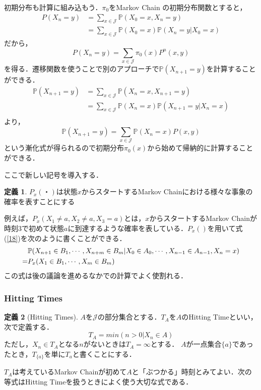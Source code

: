 \documentclass[12pt, a4paper]{jsarticle}
\theoremstyle{definition}
\newtheorem{defn}{定義}[section]
\begin{document}
初期分布も計算に組み込もう．$\pi_0$をMarkov Chain の初期分布関数とすると，
\begin{align*}
	P(X_n = y) &= \sum_{x \in \mathcal{J}}\mathbb{P} (X_0 = x, X_n = y) \\
	&= \sum_{x \in \mathcal{J}} \mathbb{P}(X_0 = x) \mathbb{P}(X_n = y | X_0 = x)
\end{align*}
だから，
\begin{equation}
	P(X_n = y) = \sum_{x \in \mathcal{J}} \pi_0(x) P^n(x,y) \label{24}
\end{equation}
を得る．遷移関数を使うことで別のアプローチで$\mathbb{P}(X_{n+1} = y)$を計算することができる．
\begin{align*}
\mathbb{P}(X_{n+1} = y) &= \sum_{x \in \mathcal{J}} \mathbb{P}(X_n = x, X_{n+1} = y) \\
&= \sum_{x \in \mathcal{J}} \mathbb{P}(X_n = x)\mathbb{P}(X_{n+1} = y | X_n = x) \\
\end{align*}
より，
\begin{equation}
\mathbb{P}(X_{n+1} = y) = \sum_{x \in \mathcal{J}} \mathbb{P}(X_n = x) P(x,y) \label{25}
\end{equation}
という漸化式が得られるので初期分布$\pi_0(x)$から始めて帰納的に計算することができる．

ここで新しい記号を導入する．
\begin{screen}
	\begin{defn}
	$P_x (・)$は状態$x$からスタートするMarkov Chainにおける様々な事象の確率を表すことにする
	\end{defn}
\end{screen}
例えば，$P_x(X_1 \neq a,X_2 \neq a,X_3 = a)$とは，$x$からスタートするMarkov Chainが時刻3で初めて状態$a$に到達するような確率を表している．$P_x()$を用いて式(\ref{18})を次のように書くことができる．
\begin{align}
&\mathbb{P}(X_{n+1} \in B_1, \cdots,X_{n+m} \in B_m | X_0 \in A_0 ,\cdots,X_{n-1} \in A_{n-1}, X_n = x) \notag \\
 = &P_x(X_1 \in B_1,\cdots, X_m \in B_m) \label{26}
\end{align}
この式は後の議論を進めるなかでの計算でよく使割れる．

\subsubsection{Hitting Times}
\begin{screen}
\begin{defn}[Hitting Times]
$A$を$\mathcal{J}$の部分集合とする．$T_A$を$A$のHitting Timeといい，次で定義する．
\[T_A = min(n > 0 | X_n \in A)\]
ただし，$X_n \in T_A$となる$n$がないときは$T_A = \infty$とする．
$A$が一点集合$\{a\}$であったとき，$T_{\{a\}}$を単に$T_a$と書くことにする．
\end{defn}
\end{screen}
$T_A$は考えているMarkov Chainが初めて$A$と「ぶつかる」時刻とみてよい．次の等式はHitting Timeを扱うときによく使う大切な式である．
\end{document}
